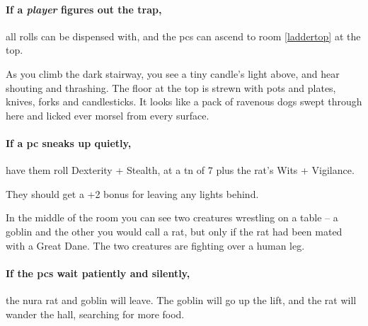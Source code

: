 \begin{multicols}{2}
\begin{itemize}
\end{itemize}

\paragraph{If a \emph{player} figures out the trap,}
all rolls can be dispensed with, and the \glspl{pc} can ascend to room \ref{laddertop} at the top.



\begin{boxtext}

  As you climb the dark stairway, you see a tiny candle's light above, and hear shouting and thrashing.
  The floor at the top is strewn with pots and plates, knives, forks and candlesticks.
  It looks like a pack of ravenous dogs swept through here and licked ever morsel from every surface.

\end{boxtext}

\paragraph{If a \gls{pc} sneaks up quietly,}
have them roll Dexterity + Stealth, at a \gls{tn} of 7 plus the rat's Wits + Vigilance.

They should get a +2 bonus for leaving any lights behind.

\begin{boxtext}

  In the middle of the room you can see two creatures wrestling on a table -- a goblin and the other you would call a rat, but only if the rat had been mated with a Great Dane.
  The two creatures are fighting over a human leg.

\end{boxtext}

\paragraph{If the \glspl{pc} wait patiently and silently,}
the nura rat and goblin will leave.
The goblin will go up the lift, and the rat will wander the hall, searching for more food.


\end{multicols}
